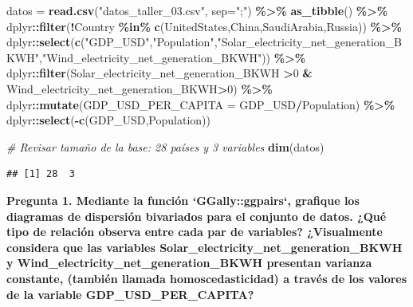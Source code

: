 \documentclass[
]{article}
\newenvironment{Shaded}{\begin{snugshade}}{\end{snugshade}}
\newcommand{\AttributeTok}[1]{\textcolor[rgb]{0.13,0.29,0.53}{#1}}
\newcommand{\CommentTok}[1]{\textcolor[rgb]{0.56,0.35,0.01}{\textit{#1}}}
\newcommand{\DecValTok}[1]{\textcolor[rgb]{0.00,0.00,0.81}{#1}}
\newcommand{\FunctionTok}[1]{\textcolor[rgb]{0.13,0.29,0.53}{\textbf{#1}}}
\newcommand{\NormalTok}[1]{#1}
\newcommand{\OtherTok}[1]{\textcolor[rgb]{0.56,0.35,0.01}{#1}}
\newcommand{\SpecialCharTok}[1]{\textcolor[rgb]{0.81,0.36,0.00}{\textbf{#1}}}
\newcommand{\StringTok}[1]{\textcolor[rgb]{0.31,0.60,0.02}{#1}}
\begin{document}
\begin{Shaded}
\begin{Highlighting}[]
\NormalTok{datos }\OtherTok{=} \FunctionTok{read.csv}\NormalTok{(}\StringTok{"datos\_taller\_03.csv"}\NormalTok{, }\AttributeTok{sep=}\StringTok{";"}\NormalTok{) }\SpecialCharTok{\%\textgreater{}\%} \FunctionTok{as\_tibble}\NormalTok{() }\SpecialCharTok{\%\textgreater{}\%} 
\NormalTok{  dplyr}\SpecialCharTok{::}\FunctionTok{filter}\NormalTok{(}\SpecialCharTok{!}\NormalTok{Country }\SpecialCharTok{\%in\%} \FunctionTok{c}\NormalTok{(}\StringTok{\textquotesingle{}UnitedStates\textquotesingle{}}\NormalTok{,}\StringTok{\textquotesingle{}China\textquotesingle{}}\NormalTok{,}\StringTok{\textquotesingle{}SaudiArabia\textquotesingle{}}\NormalTok{,}\StringTok{\textquotesingle{}Russia\textquotesingle{}}\NormalTok{)) }\SpecialCharTok{\%\textgreater{}\%} 
\NormalTok{  dplyr}\SpecialCharTok{::}\FunctionTok{select}\NormalTok{(}\FunctionTok{c}\NormalTok{(}\StringTok{"GDP\_USD"}\NormalTok{,}\StringTok{"Population"}\NormalTok{,}\StringTok{"Solar\_electricity\_net\_generation\_BKWH"}\NormalTok{,}\StringTok{"Wind\_electricity\_net\_generation\_BKWH"}\NormalTok{)) }\SpecialCharTok{\%\textgreater{}\%}
\NormalTok{  dplyr}\SpecialCharTok{::}\FunctionTok{filter}\NormalTok{(Solar\_electricity\_net\_generation\_BKWH }\SpecialCharTok{\textgreater{}}\DecValTok{0} \SpecialCharTok{\&}\NormalTok{ Wind\_electricity\_net\_generation\_BKWH}\SpecialCharTok{\textgreater{}}\DecValTok{0}\NormalTok{) }\SpecialCharTok{\%\textgreater{}\%} 
\NormalTok{  dplyr}\SpecialCharTok{::}\FunctionTok{mutate}\NormalTok{(}\AttributeTok{GDP\_USD\_PER\_CAPITA =}\NormalTok{ GDP\_USD}\SpecialCharTok{/}\NormalTok{Population) }\SpecialCharTok{\%\textgreater{}\%} 
\NormalTok{  dplyr}\SpecialCharTok{::}\FunctionTok{select}\NormalTok{(}\SpecialCharTok{{-}}\FunctionTok{c}\NormalTok{(}\StringTok{\textquotesingle{}GDP\_USD\textquotesingle{}}\NormalTok{,}\StringTok{\textquotesingle{}Population\textquotesingle{}}\NormalTok{)) }

\CommentTok{\# Revisar tamaño de la base: 28 países y 3 variables}
\FunctionTok{dim}\NormalTok{(datos)}
\end{Highlighting}
\end{Shaded}

\begin{verbatim}
## [1] 28  3
\end{verbatim}

\noindent\textbf{Pregunta 1. Mediante la función `GGally::ggpairs`, grafique los diagramas de dispersión bivariados para el conjunto de datos. ¿Qué tipo de relación observa entre cada par de variables? ¿Visualmente considera que las variables Solar\_electricity\_net\_generation\_BKWH y Wind\_electricity\_net\_generation\_BKWH presentan varianza constante, (también llamada homoscedasticidad) a través de los valores de la variable GDP\_USD\_PER\_CAPITA?}
\end{document}
